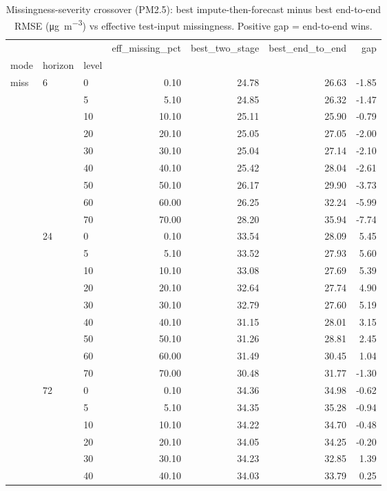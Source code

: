 \begin{table}
\caption{Missingness-severity crossover (PM2.5): best impute-then-forecast minus best end-to-end RMSE (\si{\micro\gram\per\cubic\metre}) vs effective test-input missingness. Positive gap = end-to-end wins.}
\label{tab:crossover}
\begin{tabular}{lllrrrr}
\toprule
 &  &  & eff\_missing\_pct & best\_two\_stage & best\_end\_to\_end & gap \\
mode & horizon & level &  &  &  &  \\
\midrule
\multirow[t]{27}{*}{miss} & \multirow[t]{9}{*}{6} & 0 & 0.10 & 24.78 & 26.63 & -1.85 \\
 &  & 5 & 5.10 & 24.85 & 26.32 & -1.47 \\
 &  & 10 & 10.10 & 25.11 & 25.90 & -0.79 \\
 &  & 20 & 20.10 & 25.05 & 27.05 & -2.00 \\
 &  & 30 & 30.10 & 25.04 & 27.14 & -2.10 \\
 &  & 40 & 40.10 & 25.42 & 28.04 & -2.61 \\
 &  & 50 & 50.10 & 26.17 & 29.90 & -3.73 \\
 &  & 60 & 60.00 & 26.25 & 32.24 & -5.99 \\
 &  & 70 & 70.00 & 28.20 & 35.94 & -7.74 \\
\cline{2-7}
 & \multirow[t]{9}{*}{24} & 0 & 0.10 & 33.54 & 28.09 & 5.45 \\
 &  & 5 & 5.10 & 33.52 & 27.93 & 5.60 \\
 &  & 10 & 10.10 & 33.08 & 27.69 & 5.39 \\
 &  & 20 & 20.10 & 32.64 & 27.74 & 4.90 \\
 &  & 30 & 30.10 & 32.79 & 27.60 & 5.19 \\
 &  & 40 & 40.10 & 31.15 & 28.01 & 3.15 \\
 &  & 50 & 50.10 & 31.26 & 28.81 & 2.45 \\
 &  & 60 & 60.00 & 31.49 & 30.45 & 1.04 \\
 &  & 70 & 70.00 & 30.48 & 31.77 & -1.30 \\
\cline{2-7}
 & \multirow[t]{9}{*}{72} & 0 & 0.10 & 34.36 & 34.98 & -0.62 \\
 &  & 5 & 5.10 & 34.35 & 35.28 & -0.94 \\
 &  & 10 & 10.10 & 34.22 & 34.70 & -0.48 \\
 &  & 20 & 20.10 & 34.05 & 34.25 & -0.20 \\
 &  & 30 & 30.10 & 34.23 & 32.85 & 1.39 \\
 &  & 40 & 40.10 & 34.03 & 33.79 & 0.25 \\

\end{tabular}
\end{table}

